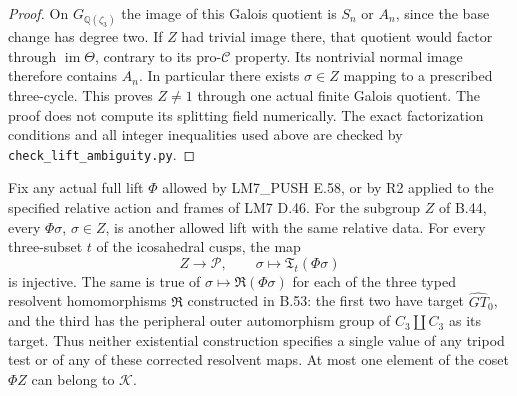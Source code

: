 \begin{proof}
On $G_{\mathbb Q(\zeta_3)}$
the image of this Galois
quotient is $S_n$ or $A_n$,
since the base change has
degree two.  If $Z$ had
trivial image there, that
quotient would factor through
$\operatorname{im}\Theta$,
contrary to its pro-$\mathscr C$
property.  Its nontrivial
normal image therefore contains
$A_n$.  In particular there
exists $\sigma\in Z$ mapping
to a prescribed three-cycle.
This proves $Z\ne1$ through
one actual finite Galois
quotient.  The proof does not
compute its splitting field
numerically.  The exact
factorization conditions and
all integer inequalities used
above are checked by
\texttt{check\_lift\_ambiguity.py}.
\end{proof}

Fix any actual full lift $\Phi$
allowed by LM7\_PUSH E.58, or
by R2 applied to the specified
relative action and frames of
LM7 D.46.  For the subgroup
$Z$ of B.44, every $\Phi\sigma$,
$\sigma\in Z$, is another
allowed lift with the same
relative data.  For every
three-subset $t$ of the
icosahedral cusps, the map
\[
 Z\longrightarrow\mathcal P,
       \qquad \sigma\longmapsto
                         \mathfrak T_t(\Phi\sigma)           \tag{B.45.1}
\]
is injective.  The same is true
of $\sigma\mapsto\mathfrak R(\Phi\sigma)$
for each of the three typed
resolvent homomorphisms
$\mathfrak R$ constructed in B.53:
the first two have target
$\widehat{GT}_0$, and the third
has the peripheral outer
automorphism group of
$C_3\amalg C_3$ as its target.
Thus neither existential
construction specifies a single
value of any tripod test or
of any of these corrected
resolvent maps.
At most one element of the
coset $\Phi Z$ can belong
to $\mathcal K$.

